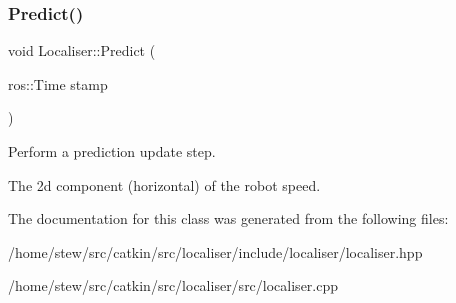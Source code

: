 \subsubsection{\texorpdfstring{Predict()}{Predict()}}
{\footnotesize\ttfamily void Localiser\+::\+Predict (\begin{DoxyParamCaption}\item[{ros\+::\+Time}]{stamp }\end{DoxyParamCaption})}



Perform a prediction update step. 

The 2d component (horizontal) of the robot speed. 

The documentation for this class was generated from the following files\+:\begin{DoxyCompactItemize}
\item 
/home/stew/src/catkin/src/localiser/include/localiser/localiser.\+hpp\item 
/home/stew/src/catkin/src/localiser/src/localiser.\+cpp\end{DoxyCompactItemize}

